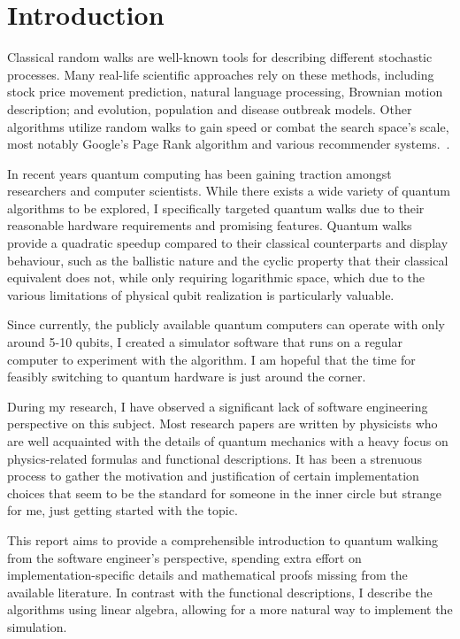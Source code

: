 \chapter{Introduction}

Classical random walks are well-known tools for describing different stochastic processes. Many real-life scientific approaches rely on these methods, including stock price movement prediction, natural language processing, Brownian motion description; and evolution, population and disease outbreak models. Other algorithms utilize random walks to gain speed or combat the search space's scale, most notably Google's Page Rank algorithm and various recommender systems.~\cite{XiaReview}.

In recent years quantum computing has been gaining traction amongst researchers and computer scientists. While there exists a wide variety of quantum algorithms to be explored, I specifically targeted quantum walks due to their reasonable hardware requirements and promising features. Quantum walks provide a quadratic speedup compared to their classical counterparts and display behaviour, such as the ballistic nature and the cyclic property that their classical equivalent does not, while only requiring logarithmic space, which due to the various limitations of physical qubit realization is particularly valuable.~\cite{Portugal}

Since currently, the publicly available quantum computers can operate with only around 5-10 qubits, I created a simulator software that runs on a regular computer to experiment with the algorithm. I am hopeful that the time for feasibly switching to quantum hardware is just around the corner.

During my research, I have observed a significant lack of software engineering perspective on this subject. Most research papers are written by physicists who are well acquainted with the details of quantum mechanics with a heavy focus on physics-related formulas and functional descriptions. It has been a strenuous process to gather the motivation and justification of certain implementation choices that seem to be the standard for someone in the inner circle but strange for me, just getting started with the topic.

This report aims to provide a comprehensible introduction to quantum walking from the software engineer's perspective, spending extra effort on implementation-specific details and mathematical proofs missing from the available literature. In contrast with the functional descriptions, I describe the algorithms using linear algebra, allowing for a more natural way to implement the simulation.

